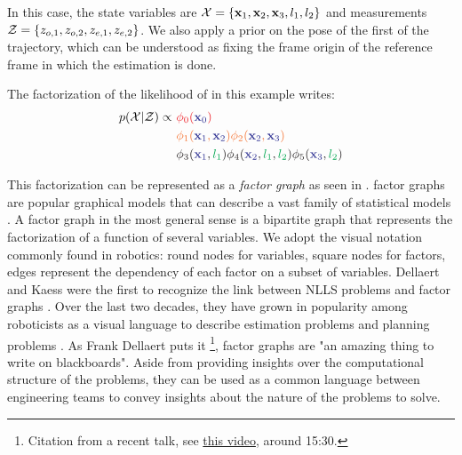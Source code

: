 In this case, the state variables are $\mathcal{X} = \{ {\bf x}_1, {\bf x}_2, {\bf x}_3, l_1, l_2\}$  and measurements $\mathcal{Z} = \{ z_{o,1}, z_{o,2}, z_{e,1}, z_{e,2}\}$.
We also apply a prior on the pose of the first \keyframe of the trajectory, which can be understood as fixing the frame origin of the reference 
frame in which the estimation is done.

The factorization of the likelihood of  in this example writes:
%
\begin{align}
    p(\cX | \cZ) \propto 
    ~&{\color{Red} \phi_0({\color{Blue} \bfx_{0}})} \\ 
    ~&{\color{Orange} \phi_1({\color{Blue} \bfx_1}, {\color{Blue} \bfx_2}) \phi_2({\color{Blue} \bfx_2}, {\color{Blue} \bfx_3})} \\ 
    ~&{\color{Black} \phi_3({\color{Blue} \bfx_1}, {\color{Green} l_1}) \phi_4({\color{Blue} \bfx_2}, {\color{Green} l_1}, {\color{Green} l_2}) \phi_5({\color{Blue} \bfx_3}, {\color{Green} l_2})} \\ 
\end{align}

This factorization can be represented as a \textit{factor graph} as seen in . 
factor graphs are popular graphical models \cite{koller2009probabilistic} that can describe a vast family of statistical models \cite{loeliger2004introduction}.
A factor graph in the most general sense is a bipartite graph that represents the factorization of a function of several variables. 
We adopt the visual notation commonly found in robotics: round nodes for variables, square nodes for factors, edges represent the dependency 
of each factor on a subset of variables. Dellaert and Kaess \cite{dellaert2006square} were the first to
recognize the link between NLLS problems and factor graphs \cite{dong2019minisam}. Over the last two decades, they have grown in popularity among roboticists as a visual language to describe 
estimation problems \cite{dellaert2017factor} and planning problems \cite{dong2016motion}. As Frank Dellaert puts it \footnote{Citation from a recent talk,
see \href{https://www.youtube.com/watch?v=-yCC7mpgL4w}{this video}, around 15:30.}, factor graphs are "an amazing thing to write on blackboards".%
Aside from providing insights over the computational structure of the problems, they can be used as a common language between engineering teams
to convey insights about the nature of the problems to solve.


